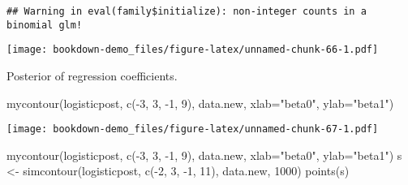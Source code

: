 \documentclass[
]{book}
\newenvironment{Shaded}{\begin{snugshade}}{\end{snugshade}}
\newcommand{\AttributeTok}[1]{\textcolor[rgb]{0.77,0.63,0.00}{#1}}
\newcommand{\DecValTok}[1]{\textcolor[rgb]{0.00,0.00,0.81}{#1}}
\newcommand{\FunctionTok}[1]{\textcolor[rgb]{0.00,0.00,0.00}{#1}}
\newcommand{\NormalTok}[1]{#1}
\newcommand{\OtherTok}[1]{\textcolor[rgb]{0.56,0.35,0.01}{#1}}
\newcommand{\SpecialCharTok}[1]{\textcolor[rgb]{0.00,0.00,0.00}{#1}}
\newcommand{\StringTok}[1]{\textcolor[rgb]{0.31,0.60,0.02}{#1}}
\begin{document}
\begin{verbatim}
## Warning in eval(family$initialize): non-integer counts in a binomial glm!
\end{verbatim}

\begin{Shaded}
\end{Shaded}

\texttt{[image: bookdown-demo\_files/figure-latex/unnamed-chunk-66-1.pdf]}

Posterior of regression coefficients.

\begin{Shaded}
\begin{Highlighting}[]
\FunctionTok{mycontour}\NormalTok{(logisticpost, }\FunctionTok{c}\NormalTok{(}\SpecialCharTok{{-}}\DecValTok{3}\NormalTok{, }\DecValTok{3}\NormalTok{, }\SpecialCharTok{{-}}\DecValTok{1}\NormalTok{, }\DecValTok{9}\NormalTok{), data.new,}
  \AttributeTok{xlab=}\StringTok{"beta0"}\NormalTok{, }\AttributeTok{ylab=}\StringTok{"beta1"}\NormalTok{)}
\end{Highlighting}
\end{Shaded}

\texttt{[image: bookdown-demo\_files/figure-latex/unnamed-chunk-67-1.pdf]}

\begin{Shaded}
\begin{Highlighting}[]
\FunctionTok{mycontour}\NormalTok{(logisticpost, }\FunctionTok{c}\NormalTok{(}\SpecialCharTok{{-}}\DecValTok{3}\NormalTok{, }\DecValTok{3}\NormalTok{, }\SpecialCharTok{{-}}\DecValTok{1}\NormalTok{, }\DecValTok{9}\NormalTok{), data.new,}
  \AttributeTok{xlab=}\StringTok{"beta0"}\NormalTok{, }\AttributeTok{ylab=}\StringTok{"beta1"}\NormalTok{)}
\NormalTok{s }\OtherTok{\textless{}{-}} \FunctionTok{simcontour}\NormalTok{(logisticpost, }\FunctionTok{c}\NormalTok{(}\SpecialCharTok{{-}}\DecValTok{2}\NormalTok{, }\DecValTok{3}\NormalTok{, }\SpecialCharTok{{-}}\DecValTok{1}\NormalTok{, }\DecValTok{11}\NormalTok{),}
\NormalTok{                data.new, }\DecValTok{1000}\NormalTok{)}
\FunctionTok{points}\NormalTok{(s)}
\end{Highlighting}
\end{Shaded}
\end{document}
